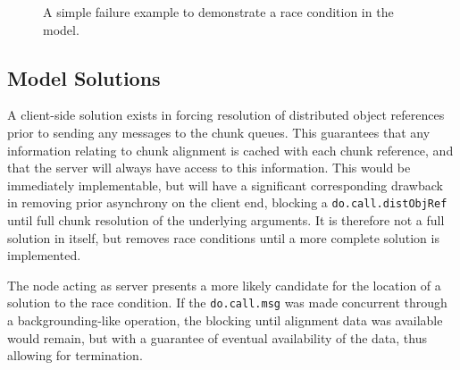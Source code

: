 \documentclass[a4paper,10pt]{article}
\begin{document}
\begin{figure}
	\centering
	\caption{\label{fig:counterex}A simple failure example to demonstrate a race condition in the model.}
\end{figure}

\subsection{Model Solutions}

A client-side solution exists in forcing resolution of distributed object
references prior to sending any messages to the chunk queues.
This guarantees that any information relating to chunk alignment is cached with
each chunk reference, and that the server will always have access to this
information.
This would be immediately implementable, but will have a significant
corresponding drawback in removing prior asynchrony on the client end, blocking
a \texttt{do.call.distObjRef} until full chunk resolution of the
underlying arguments.
It is therefore not a full solution in itself, but removes race conditions
until a more complete solution is implemented.

The node acting as server presents a more likely candidate for the location of
a solution to the race condition.
If the \texttt{do.call.msg} was made concurrent through a
backgrounding-like operation, the blocking until alignment data was available
would remain, but with a guarantee of eventual availability of the data, thus
allowing for termination.
\end{document}
